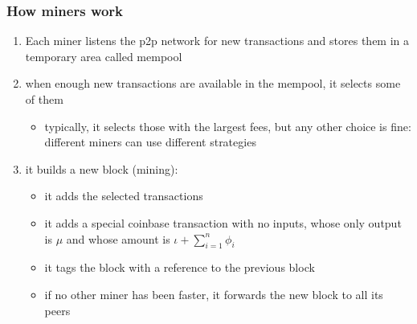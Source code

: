 \documentclass[11pt]{beamer}  %
\begin{document}
\begin{frame}\frametitle{How miners work}

  \begin{enumerate}
    \item Each miner listens the p2p network for new transactions and stores them in a
      temporary area called mempool
    \item when enough new transactions are available in the mempool, it selects some of them
      \begin{itemize}
      \item typically, it selects those with the largest fees, but any other choice is fine: different miners can use different strategies
      \end{itemize}
    \item it builds a new block (\alert{mining}):
      \begin{itemize}
      \item it adds the selected transactions
      \item it adds a special \alert{coinbase transaction} with no inputs, whose only output is $\mu$
        and whose amount is $\iota+\sum_{i=1}^n\phi_i$
      \item it tags the block with a reference to the previous block
      \item if no other miner has been faster, it forwards the new block to all its peers
      \end{itemize}
  \end{enumerate}
\end{frame}
\end{document}
